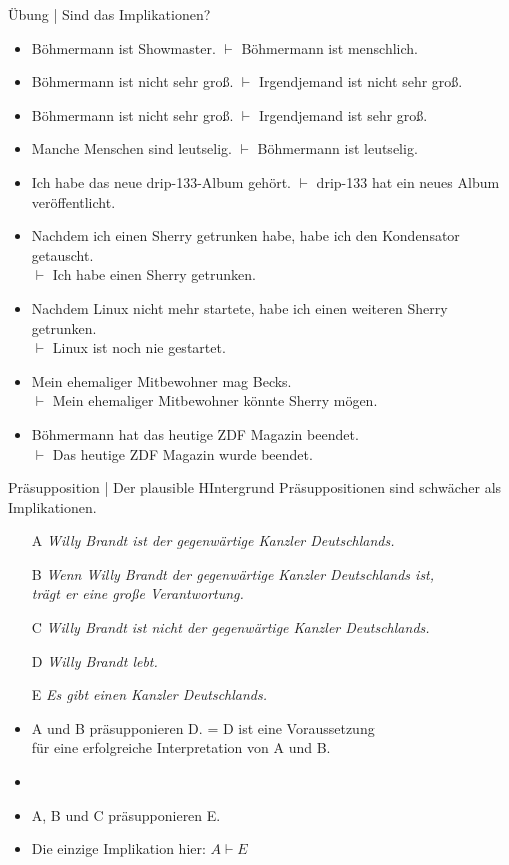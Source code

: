\begin{frame}
  {Übung | Sind das Implikationen?}
  \begin{itemize}[<+->]\small
    \item Böhmermann ist Showmaster. $\vdash$ Böhmermann ist menschlich.
    \item Böhmermann ist nicht sehr groß. $\vdash$ Irgendjemand ist nicht sehr groß.
    \item Böhmermann ist nicht sehr groß. $\vdash$ Irgendjemand ist sehr groß.
    \item Manche Menschen sind leutselig. $\vdash$ Böhmermann ist leutselig.
    \item Ich habe das neue drip-133-Album gehört. $\vdash$ drip-133 hat ein neues Album veröffentlicht.
    \item Nachdem ich einen Sherry getrunken habe, habe ich den Kondensator getauscht.\\
      $\vdash$ Ich habe einen Sherry getrunken.
    \item Nachdem Linux nicht mehr startete, habe ich einen weiteren Sherry getrunken.\\
      $\vdash$ Linux ist noch nie gestartet.
    \item Mein ehemaliger Mitbewohner mag Becks.\\
      $\vdash$ Mein ehemaliger Mitbewohner könnte Sherry mögen.
    \item Böhmermann hat das heutige ZDF Magazin beendet.\\
      $\vdash$ Das heutige ZDF Magazin wurde beendet.
  \end{itemize}
\end{frame}

\begin{frame}
  {Präsupposition | Der plausible HIntergrund}
  \onslide<+->
  \onslide<+->
  Präsuppositionen sind schwächer als Implikationen.\\
  \Zeile
  \begin{itemize}[<+->]
    \item[A] \textit{Willy Brandt ist der gegenwärtige Kanzler Deutschlands.}
    \item[B] \textit{Wenn Willy Brandt der gegenwärtige Kanzler Deutschlands ist,\\
      trägt er eine große Verantwortung.}
    \item[C] \textit{Willy Brandt ist nicht der gegenwärtige Kanzler Deutschlands.}
    \item[D] \textit{Willy Brandt lebt.}
    \item[E] \textit{Es gibt einen Kanzler Deutschlands.}
      \Halbzeile
    \item \alert{A und B präsupponieren D.} = D ist eine Voraussetzung\\
      für eine erfolgreiche Interpretation von A und B.
    \item {}
    \item \alert{A, B und C präsupponieren E.}
      \Halbzeile
    \item Die einzige Implikation hier: $A\vdash E$
  \end{itemize}
\end{frame}


